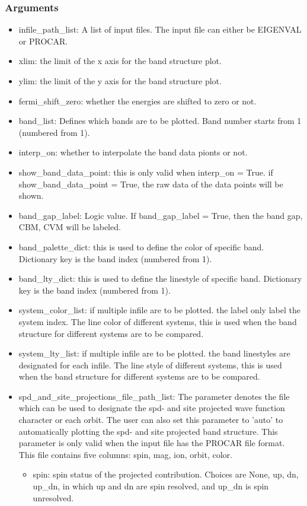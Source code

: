 \documentclass[12pt]{book}
\begin{document}
\subsubsection{Arguments}
\begin{itemize}
\item infile\_path\_list: A list of input files. The input file can either be EIGENVAL or PROCAR.
\item xlim: the limit of the x axis for the band structure plot.
\item ylim: the limit of the y axis for the band structure plot.
\item fermi\_shift\_zero: whether the energies are shifted to zero or not.
\item band\_list: Defines which bands are to be plotted. Band number starts from 1 (numbered from 1).
\item interp\_on: whether to interpolate the band data pionts or not.
\item show\_band\_data\_point: this is only valid when interp\_on = True. if show\_band\_data\_point = True, the raw data of the data points will be shown.
\item band\_gap\_label: Logic value. If band\_gap\_label = True, then the band gap, CBM, CVM will be labeled.
\item band\_palette\_dict: this is used to define the color of specific band. Dictionary key is the band index (numbered from 1).
\item band\_lty\_dict: this is used to define the linestyle of specific band. Dictionary key is the band index (numbered from 1).
\item system\_color\_list: if multiple infile are to be plotted. the label only label the system index. The line color of different systems, this is used when the band structure for different systems are to be compared.
\item system\_lty\_list: if multiple infile are to be plotted. the band linestyles are designated for each infile. The line style of different systems, this is used when the band structure for different systems are to be compared.
\item spd\_and\_site\_projections\_file\_path\_list: The parameter denotes the file which can be used to designate the spd- and site projected wave function character or each orbit.  The user can also set this parameter to 'auto' to automatically plotting the spd- and site projected band structure. This parameter is only valid when the input file has the PROCAR file format. This file contains five columns: spin, mag, ion, orbit, color.
    \begin{itemize}
    \item spin: spin status of the projected contribution. Choices are None, up, dn, up\_dn, in which up and dn are spin resolved, and up\_dn is spin unresolved.


\end{itemize}
\end{itemize}
\end{document}
